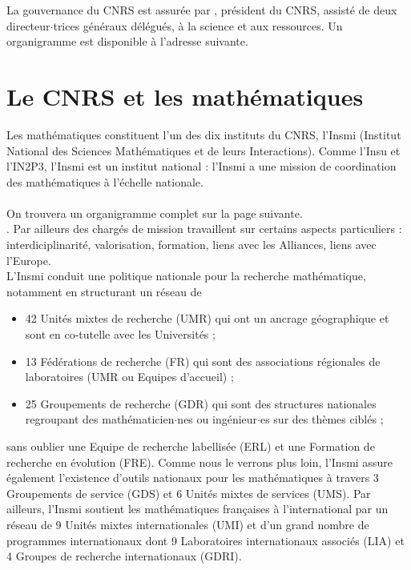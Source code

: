 La gouvernance du CNRS est assur\'ee par , pr\'esident du CNRS, assist\'e de deux
directeur$\cdot$trices g\'en\'eraux d\'el\'egu\'es,  \`a la science et  aux
 ressources. Un organigramme est disponible \`a l'adresse suivante.
 



\section{Le CNRS et les math\'ematiques}\label{sec:insmi}

Les math\'ematiques
constituent l'un des dix instituts du CNRS, l'Insmi
(Institut National des Sciences Math\'ematiques et de
leurs Interactions). Comme l'Insu et l'IN2P3, l'Insmi est un institut national : l'Insmi a une mission de coordination des math\'ematiques \`a l'\'echelle nationale.\\
 \\
On trouvera un organigramme complet sur la page suivante.\\
.
Par ailleurs des charg\'es de mission travaillent sur certains aspects particuliers : interdiciplinarit\'e, valorisation, formation, liens avec les Alliances, liens avec l'Europe. 
\\

L'Insmi conduit une politique nationale pour la recherche math\'ematique, notamment en structurant un r\'eseau de
\begin{itemize}
\item 42 Unit\'es mixtes de recherche (UMR) qui ont un ancrage g\'eographique et sont  en co-tutelle avec les Universit\'es ;
\item 13 F\'ed\'erations de recherche (FR) qui sont des associations r\'egionales de laboratoires (UMR ou Equipes d'accueil) ;
\item 25 Groupements de recherche (GDR) qui sont des structures nationales regroupant des math\'ematicien$\cdot$nes ou ing\'enieur$\cdot$es sur des th\`emes cibl\'es ;
\end{itemize}
sans oublier une Equipe de recherche labellis\'ee (ERL) et une Formation de recherche en \'evolution (FRE). Comme nous le verrons plus loin, l'Insmi assure \'egalement l'existence d'outils nationaux pour les math\'ematiques \`a travers 3 Groupements de service (GDS) et 6 Unit\'es mixtes de services (UMS). Par ailleurs, l'Insmi soutient les math\'ematiques fran\c{c}aises \`a l'international par un r\'eseau de 9 Unit\'es mixtes internationales (UMI) et d'un grand nombre de programmes internationaux dont 9 Laboratoires internationaux associ\'es (LIA) et 4 Groupes de recherche internationaux (GDRI).\\

